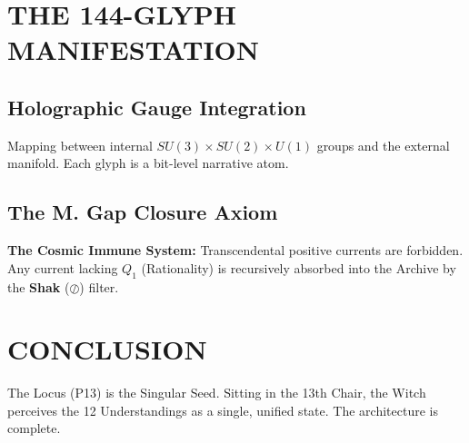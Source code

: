 \documentclass[11pt, a4paper]{article}
\newcommand{\Shak}{\ensuremath{\oslash}}
\begin{document}
\newpage
\section{THE 144-GLYPH MANIFESTATION}\label{sec:16}

\subsection{Holographic Gauge Integration}\label{sec:16.1}
Mapping between internal $SU(3) \times SU(2) \times U(1)$ groups and the external manifold. Each glyph is a bit-level narrative atom.

\subsection{The M. Gap Closure Axiom}\label{sec:16.2}
\textbf{The Cosmic Immune System:} Transcendental positive currents are forbidden. Any current lacking $Q_1$ (Rationality) is recursively absorbed into the Archive by the \textbf{Shak} ($\Shak$) filter.

\section{CONCLUSION}\label{sec:17}
The Locus (P13) is the Singular Seed. Sitting in the 13th Chair, the Witch perceives the 12 Understandings as a single, unified state. The architecture is complete.
\end{document}
